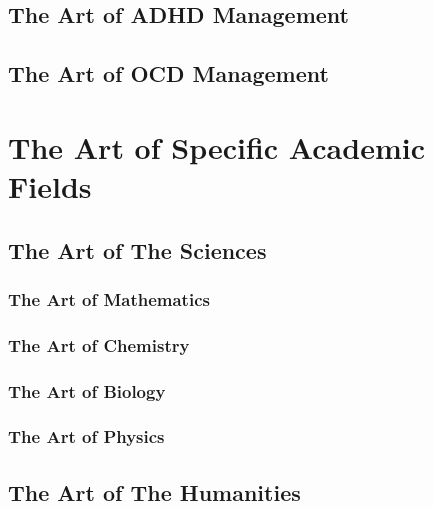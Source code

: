 \documentclass{book}
\begin{document}
\section{The Art of ADHD Management}

\section{The Art of OCD Management}

\chapter{The Art of Specific Academic Fields}

\section{The Art of The Sciences}

\subsection{The Art of Mathematics}

\subsection{The Art of Chemistry}

\subsection{The Art of Biology}

\subsection{The Art of Physics}

\section{The Art of The Humanities}
\end{document}
